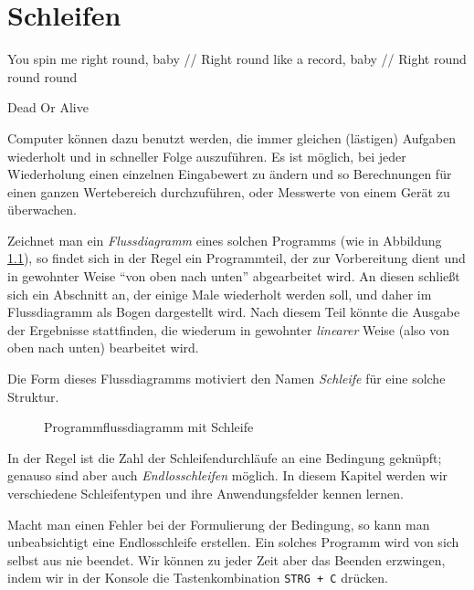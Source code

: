 \chapter{Schleifen} \label{chp:loops}
\epigraph{You spin me right round, baby // Right round like a record, baby // Right round round round}
{Dead Or Alive}

Computer können dazu benutzt werden, die immer gleichen (lästigen) Aufgaben wiederholt und in schneller Folge auszuführen. Es ist möglich, bei jeder Wiederholung einen einzelnen Eingabewert zu ändern und so \eg Berechnungen für einen ganzen Wertebereich durchzuführen, oder Messwerte von einem Gerät zu überwachen.

Zeichnet man ein \emph{Flussdiagramm} eines solchen Programms (wie in Abbildung \ref{fig:FlowBasicLoop}), so findet sich in der Regel ein Programmteil, der zur Vorbereitung dient und in gewohnter Weise \enquote{von oben nach unten} abgearbeitet wird. An diesen schließt sich ein Abschnitt an, der einige Male wiederholt werden soll, und daher im Flussdiagramm als Bogen dargestellt wird. Nach diesem Teil könnte die Ausgabe der Ergebnisse stattfinden, die wiederum in gewohnter \emph{linearer} Weise (also von oben nach unten) bearbeitet wird. 

Die Form dieses Flussdiagramms motiviert den Namen \emph{Schleife} für eine solche Struktur.

\begin{figure}[h!]
\begin{center}
\caption{Programmflussdiagramm mit Schleife} \label{fig:FlowBasicLoop}
\end{center}
\end{figure}

In der Regel ist die Zahl der Schleifendurchläufe an eine Bedingung geknüpft; genauso sind aber auch \emph{Endlosschleifen} möglich. In diesem Kapitel werden wir verschiedene Schleifentypen und ihre Anwendungsfelder kennen lernen.

\begin{hintbox}
Macht man einen Fehler bei der Formulierung der Bedingung, so kann man unbeabsichtigt eine Endlosschleife erstellen. Ein solches Programm wird von sich selbst aus nie beendet. Wir können zu jeder Zeit aber das Beenden erzwingen, indem wir in der Konsole die Tastenkombination \texttt{STRG + C} drücken.
\end{hintbox}

